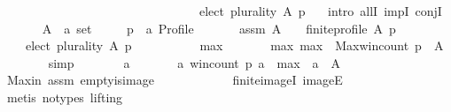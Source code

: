 \begin{isabellebody}
\ \ \ \ \ \ \ \ \ \ \ \ \ \ \ \ \ \ \ \ \ \ \ \ \ \ \ \ \ \ \ \ elect\ plurality\ A\ p\ {\isasymnoteq}\ {\isacharbraceleft}{\kern0pt}{\isacharbraceright}{\kern0pt}{\isachardoublequoteclose}\isanewline
%
\isadelimproof
%
\endisadelimproof
%
\isatagproof
{}\isamarkupfalse%
\ {\isacharparenleft}{\kern0pt}intro\ allI\ impI\ conjI{\isacharparenright}{\kern0pt}\isanewline
\ \ \isamarkupfalse%
\isanewline
\ \ \ \ A\ {\isacharcolon}{\kern0pt}{\isacharcolon}{\kern0pt}\ {\isachardoublequoteopen}{\isacharprime}{\kern0pt}a\ set{\isachardoublequoteclose}\ \isanewline
\ \ \ \ p\ {\isacharcolon}{\kern0pt}{\isacharcolon}{\kern0pt}\ {\isachardoublequoteopen}{\isacharprime}{\kern0pt}a\ Profile{\isachardoublequoteclose}\isanewline
\ \ \isamarkupfalse%
\isanewline
\ \ \ \ assm{}{\isacharcolon}{\kern0pt}\ {\isachardoublequoteopen}A\ {\isasymnoteq}\ {\isacharbraceleft}{\kern0pt}{\isacharbraceright}{\kern0pt}\ {\isasymand}\ finite{\isacharunderscore}{\kern0pt}profile\ A\ p{\isachardoublequoteclose}\isanewline
\ \ \isamarkupfalse%
\isanewline
\ \ \ \ {\isachardoublequoteopen}elect\ plurality\ A\ p\ {\isasymnoteq}\ {\isacharbraceleft}{\kern0pt}{\isacharbraceright}{\kern0pt}{\isachardoublequoteclose}\isanewline
\ \ \isamarkupfalse%
\isanewline
\ \ \ \ \isamarkupfalse%
\ max\ \isanewline
\ \ \ \ \ \ max{\isacharcolon}{\kern0pt}\ {\isachardoublequoteopen}max\ {\isacharequal}{\kern0pt}\ Max{\isacharparenleft}{\kern0pt}win{\isacharunderscore}{\kern0pt}count\ p\ {\isacharbackquote}{\kern0pt}\ A{\isacharparenright}{\kern0pt}{\isachardoublequoteclose}\isanewline
\ \ \ \ \ \ \isamarkupfalse%
\ simp\isanewline
\ \ \ \ \isamarkupfalse%
\ \isamarkupfalse%
\ a\ \isanewline
\ \ \ \ \ \ a{\isacharcolon}{\kern0pt}\ {\isachardoublequoteopen}win{\isacharunderscore}{\kern0pt}count\ p\ a\ {\isacharequal}{\kern0pt}\ max\ {\isasymand}\ a\ {\isasymin}\ A{\isachardoublequoteclose}\isanewline
\ \ \ \ \ \ \isamarkupfalse%
\ Max{\isacharunderscore}{\kern0pt}in\ assm{}\ empty{\isacharunderscore}{\kern0pt}is{\isacharunderscore}{\kern0pt}image\isanewline
\ \ \ \ \ \ \ \ \ \ \ \ finite{\isacharunderscore}{\kern0pt}imageI\ imageE\isanewline
\ \ \ \ \ \ \isamarkupfalse%
\ {\isacharparenleft}{\kern0pt}metis\ {\isacharparenleft}{\kern0pt}no{\isacharunderscore}{\kern0pt}types{\isacharcomma}{\kern0pt}\ lifting{\isacharparenright}{\kern0pt}{\isacharparenright}{\kern0pt}\isanewline

\end{isabellebody}
